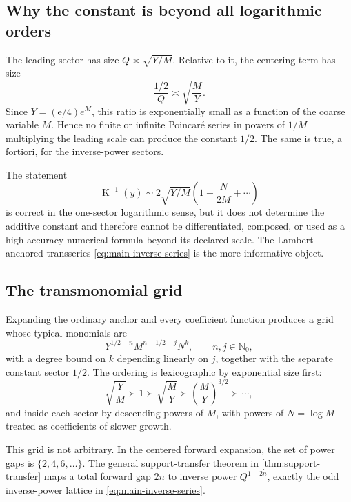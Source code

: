 \documentclass[11pt,oneside]{article}
\theoremstyle{plain}
\theoremstyle{definition}
\theoremstyle{remark}
\newcommand{\Kfun}{\operatorname{K}}
\newcommand{\e}{\mathrm{e}}
\newcommand{\N}{\mathbb{N}}
\begin{document}
\subsection{Why the constant is beyond all logarithmic orders}

The leading sector has size \(Q\asymp\sqrt{Y/M}\).  Relative to it, the
centering term has size
\[
 \frac{1/2}{Q}\asymp\sqrt{\frac{M}{Y}}.
\]
Since \(Y=(\e/4)e^M\), this ratio is exponentially small as a function of the
coarse variable \(M\).  Hence no finite or infinite Poincar\'e series in powers
of \(1/M\) multiplying the leading scale can produce the constant \(1/2\).
The same is true, a fortiori, for the inverse-power sectors.

\begin{warningbox}
The statement
\[
 \Kfun_+^{-1}(y)\sim2\sqrt{Y/M}
 \left(1+\frac{N}{2M}+\cdots\right)
\]
is correct in the one-sector logarithmic sense, but it does not determine the
additive constant and therefore cannot be differentiated, composed, or used as
a high-accuracy numerical formula beyond its declared scale.  The Lambert-
anchored transseries \eqref{eq:main-inverse-series} is the more informative
object.
\end{warningbox}

\subsection{The transmonomial grid}

Expanding the ordinary anchor and every coefficient function produces a grid
whose typical monomials are
\begin{equation}
 Y^{1/2-n}M^{n-1/2-j}N^k,
 \qquad n,j\in\N_0,
 \label{eq:K-transmonomial-grid}
\end{equation}
with a degree bound on \(k\) depending linearly on \(j\), together with the
separate constant sector \(1/2\).  The ordering is lexicographic by exponential
size first:
\[
 \sqrt{\frac{Y}{M}}
 \succ 1
 \succ \sqrt{\frac{M}{Y}}
 \succ \left(\frac{M}{Y}\right)^{3/2}
 \succ\cdots,
\]
and inside each sector by descending powers of \(M\), with powers of
\(N=\log M\) treated as coefficients of slower growth.

This grid is not arbitrary.  In the centered forward expansion, the set of
power gaps is \(\{2,4,6,\ldots\}\).  The general support-transfer theorem in
\cref{thm:support-transfer} maps a total forward gap \(2n\) to inverse power
\(Q^{1-2n}\), exactly the odd inverse-power lattice in
\eqref{eq:main-inverse-series}.
\end{document}
